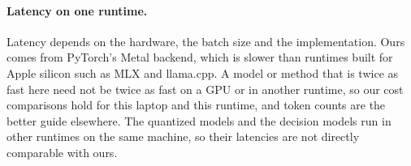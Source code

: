 \paragraph{Latency on one runtime.}
Latency depends on the hardware, the batch size and the implementation. Ours comes from PyTorch's Metal backend, which is slower than runtimes built for Apple silicon such as MLX and llama.cpp. A model or method that is twice as fast here need not be twice as fast on a GPU or in another runtime, so our cost comparisons hold for this laptop and this runtime, and token counts are the better guide elsewhere. The quantized models and the decision models run in other runtimes on the same machine, so their latencies are not directly comparable with ours.
